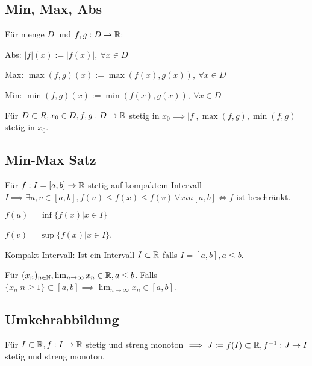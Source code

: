 \subsection{Min, Max, Abs}
Für menge $D$ und $f,g: D \to \mathbb{R}$:
\begin{compactdesc}
    \item[Abs:] $|f|(x) := |f(x)|, \ \forall x \in D$
    \item[Max:] $\max(f,g)(x) := \max(f(x), g(x)), \ \forall x \in D$
    \item[Min:] $\min(f,g)(x) := \min(f(x), g(x)), \ \forall x \in D$
\end{compactdesc}
\begin{compactitem}
    \item Für $D \subset R, x_0 \in D, f,g: D \to \mathbb{R}$ stetig in $x_0 \implies |f|, \max(f,g), \min(f,g)$ stetig in $x_0$.
\end{compactitem}

\subsection{Min-Max Satz}
Für $f:I = [a, b] \to \mathbb{R}$ stetig auf kompaktem Intervall $I \implies \exists u,v \in [a,b], f(u) \le f(x) \le f(v) \ \forall x in [a,b] \iff f$ ist beschränkt.

\begin{inparaitem}
    \item $f(u) = \inf \{f(x) | x \in I\}$
    \item $f(v) = \sup \{f(x) | x \in I\}$.
\end{inparaitem}
\begin{compactdesc}
    \item[Kompakt Intervall:] Ist ein Intervall $I \subset \mathbb{R}$ falls $I = [a, b], a \le b$.
        \begin{compactitem}
        \item Für $(x_n)_{n \in \mathbb{N}}, \lim_{n \to \infty}x_n \in \mathbb{R}, a \le b$. Falls $\{x_n | n \ge 1\} \subset [a, b] \implies \lim_{n \to \infty}x_n \in [a, b]$.
        \end{compactitem}
\end{compactdesc}

\subsection{Umkehrabbildung}
Für $I \subset \mathbb{R}, f: I \to \mathbb{R}$ stetig und streng monoton $\implies J:=f(I) \subset \mathbb{R}, f^{-1}:  J \to I$ stetig und streng monoton.

